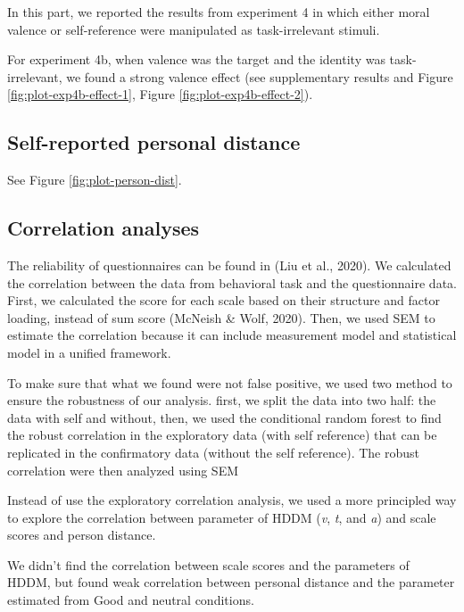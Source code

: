 \documentclass[
  english,
  man]{apa6}
\begin{document}
In this part, we reported the results from experiment 4 in which either moral valence or self-reference were manipulated as task-irrelevant stimuli.

For experiment 4b, when valence was the target and the identity was task-irrelevant, we found a strong valence effect (see supplementary results and Figure \ref{fig:plot-exp4b-effect-1}, Figure \ref{fig:plot-exp4b-effect-2}).

\hypertarget{self-reported-personal-distance}{%
\subsection{Self-reported personal distance}\label{self-reported-personal-distance}}

See Figure \ref{fig:plot-person-dist}.

\hypertarget{correlation-analyses}{%
\subsection{Correlation analyses}\label{correlation-analyses}}

The reliability of questionnaires can be found in (Liu et al., 2020). We calculated the correlation between the data from behavioral task and the questionnaire data. First, we calculated the score for each scale based on their structure and factor loading, instead of sum score (McNeish \& Wolf, 2020). Then, we used SEM to estimate the correlation because it can include measurement model and statistical model in a unified framework.

To make sure that what we found were not false positive, we used two method to ensure the robustness of our analysis. first, we split the data into two half: the data with self and without, then, we used the conditional random forest to find the robust correlation in the exploratory data (with self reference) that can be replicated in the confirmatory data (without the self reference). The robust correlation were then analyzed using SEM

Instead of use the exploratory correlation analysis, we used a more principled way to explore the correlation between parameter of HDDM (\emph{v}, \emph{t}, and \emph{a}) and scale scores and person distance.

We didn't find the correlation between scale scores and the parameters of HDDM, but found weak correlation between personal distance and the parameter estimated from Good and neutral conditions.
\end{document}
